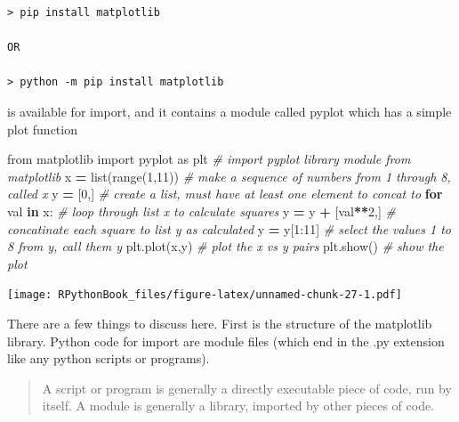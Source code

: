 \documentclass[]{book}
\newenvironment{Shaded}{\begin{snugshade}}{\end{snugshade}}
\newcommand{\KeywordTok}[1]{\textcolor[rgb]{0.13,0.29,0.53}{\textbf{#1}}}
\newcommand{\DecValTok}[1]{\textcolor[rgb]{0.00,0.00,0.81}{#1}}
\newcommand{\ImportTok}[1]{#1}
\newcommand{\CommentTok}[1]{\textcolor[rgb]{0.56,0.35,0.01}{\textit{#1}}}
\newcommand{\ControlFlowTok}[1]{\textcolor[rgb]{0.13,0.29,0.53}{\textbf{#1}}}
\newcommand{\OperatorTok}[1]{\textcolor[rgb]{0.81,0.36,0.00}{\textbf{#1}}}
\newcommand{\BuiltInTok}[1]{#1}
\newcommand{\NormalTok}[1]{#1}
\theoremstyle{definition}
\theoremstyle{definition}
\theoremstyle{definition}
\theoremstyle{remark}
\begin{document}
\begin{verbatim}
> pip install matplotlib

OR

> python -m pip install matplotlib
\end{verbatim}

is available for import, and it contains a module called pyplot which
has a simple plot function


\begin{Shaded}
\begin{Highlighting}[]
\ImportTok{from}\NormalTok{ matplotlib }\ImportTok{import}\NormalTok{ pyplot }\ImportTok{as}\NormalTok{ plt  }\CommentTok{# import pyplot library module from matplotlib}
\NormalTok{x }\OperatorTok{=} \BuiltInTok{list}\NormalTok{(}\BuiltInTok{range}\NormalTok{(}\DecValTok{1}\NormalTok{,}\DecValTok{11}\NormalTok{))                  }\CommentTok{# make a sequence of numbers from 1 through 8, called x}
\NormalTok{y }\OperatorTok{=}\NormalTok{ [}\DecValTok{0}\NormalTok{,]                              }\CommentTok{# create a list, must have at least one element to concat to}
\ControlFlowTok{for}\NormalTok{ val }\KeywordTok{in}\NormalTok{ x:                         }\CommentTok{# loop through list x to calculate squares}
\NormalTok{    y }\OperatorTok{=}\NormalTok{ y }\OperatorTok{+}\NormalTok{ [val}\OperatorTok{**}\DecValTok{2}\NormalTok{,]                 }\CommentTok{# concatinate each square to list y as calculated}
\NormalTok{y }\OperatorTok{=}\NormalTok{ y[}\DecValTok{1}\NormalTok{:}\DecValTok{11}\NormalTok{]                            }\CommentTok{# select the values 1 to 8 from y, call them y}
\NormalTok{plt.plot(x,y)                         }\CommentTok{# plot the x vs y pairs}
\NormalTok{plt.show()                            }\CommentTok{# show the plot}
\end{Highlighting}
\end{Shaded}

\texttt{[image: RPythonBook\_files/figure-latex/unnamed-chunk-27-1.pdf]}

There are a few things to discuss here. First is the structure of the
matplotlib library. Python code for import are module files (which end
in the .py extension like any python scripts or programs).

\begin{quote}
A script or program is generally a directly executable piece of code,
run by itself. A module is generally a library, imported by other pieces
of code.
\end{quote}
\end{document}
